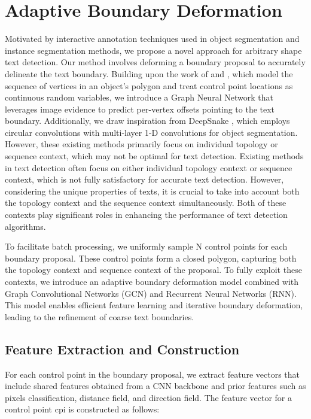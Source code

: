 \section{Adaptive Boundary Deformation}
Motivated by interactive annotation techniques used in object segmentation and instance segmentation methods, we propose a novel approach for arbitrary shape text detection. Our method involves deforming a boundary proposal to accurately delineate the text boundary. Building upon the work of \cite{acuna2018efficient} and \cite{ling2019fast}, which model the sequence of vertices in an object's polygon and treat control point locations as continuous random variables, we introduce a Graph Neural Network that leverages image evidence to predict per-vertex offsets pointing to the text boundary. Additionally, we draw inspiration from DeepSnake \cite{peng2020deep}, which employs circular convolutions with multi-layer 1-D convolutions for object segmentation. However, these existing methods primarily focus on individual topology or sequence context, which may not be optimal for text detection. Existing methods in text detection often focus on either individual topology context or sequence context, which is not fully satisfactory for accurate text detection. However, considering the unique properties of texts, it is crucial to take into account both the topology context and the sequence context simultaneously. Both of these contexts play significant roles in enhancing the performance of text detection algorithms.

To facilitate batch processing, we uniformly sample N control points for each boundary proposal. These control points form a closed polygon, capturing both the topology context and sequence context of the proposal. To fully exploit these contexts, we introduce an adaptive boundary deformation model combined with Graph Convolutional Networks (GCN) and Recurrent Neural Networks (RNN). This model enables efficient feature learning and iterative boundary deformation, leading to the refinement of coarse text boundaries.

\subsection{Feature Extraction and Construction}
For each control point in the boundary proposal, we extract feature vectors that include shared features obtained from a CNN backbone and prior features such as pixels classification, distance field, and direction field. The feature vector for a control point cpi is constructed as follows:

